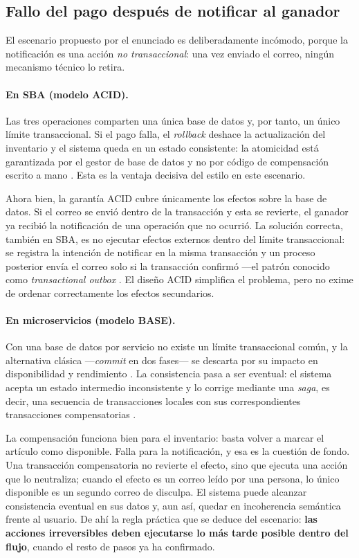 \subsection{Fallo del pago después de notificar al ganador}

El escenario propuesto por el enunciado es deliberadamente incómodo, porque la notificación es una acción \emph{no transaccional}: una vez enviado el correo, ningún mecanismo técnico lo retira.

\paragraph{En SBA (modelo ACID).} Las tres operaciones comparten una única base de datos y, por tanto, un único límite transaccional. Si el pago falla, el \emph{rollback} deshace la actualización del inventario y el sistema queda en un estado consistente: la atomicidad está garantizada por el gestor de base de datos y no por código de compensación escrito a mano \parencite{richardsford2020}. Esta es la ventaja decisiva del estilo en este escenario.

Ahora bien, la garantía ACID cubre únicamente los efectos sobre la base de datos. Si el correo se envió dentro de la transacción y esta se revierte, el ganador ya recibió la notificación de una operación que no ocurrió. La solución correcta, también en SBA, es no ejecutar efectos externos dentro del límite transaccional: se registra la intención de notificar en la misma transacción y un proceso posterior envía el correo solo si la transacción confirmó ---el patrón conocido como \emph{transactional outbox} \parencite{fordhardparts2021}. El diseño ACID simplifica el problema, pero no exime de ordenar correctamente los efectos secundarios.

\paragraph{En microservicios (modelo BASE).} Con una base de datos por servicio no existe un límite transaccional común, y la alternativa clásica ---\emph{commit} en dos fases--- se descarta por su impacto en disponibilidad y rendimiento \parencite{fordhardparts2021}. La consistencia pasa a ser eventual: el sistema acepta un estado intermedio inconsistente y lo corrige mediante una \emph{saga}, es decir, una secuencia de transacciones locales con sus correspondientes transacciones compensatorias \parencite{richardsford2020}.

La compensación funciona bien para el inventario: basta volver a marcar el artículo como disponible. Falla para la notificación, y esa es la cuestión de fondo. Una transacción compensatoria no revierte el efecto, sino que ejecuta una acción que lo neutraliza; cuando el efecto es un correo leído por una persona, lo único disponible es un segundo correo de disculpa. El sistema puede alcanzar consistencia eventual en sus datos y, aun así, quedar en incoherencia semántica frente al usuario. De ahí la regla práctica que se deduce del escenario: \textbf{las acciones irreversibles deben ejecutarse lo más tarde posible dentro del flujo}, cuando el resto de pasos ya ha confirmado.

